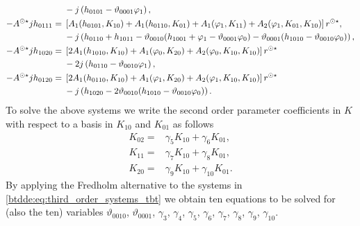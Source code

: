 \begin{equation}
\begin{aligned}
                         & -j\left(h_{0101} - \vartheta_{0001} \varphi_1\right), \\
-A^{\odot\star} jh_{0111} ={}& \left[A_1(h_{0101},K_{10}) + A_1(h_{0110},K_{01}) + A_1(\varphi_1,K_{11}) + A_2(\varphi_1,K_{01},K_{10})\right]r^{\odot\star}, \\
                         & -j\left(h_{0110} + h_{1011} - \vartheta_{0010} (h_{1001} + \varphi_1 - \vartheta_{0001} \varphi_0) - \vartheta_{0001} (h_{1010} - \vartheta_{0010} \varphi_0) \right), \\
-A^{\odot\star} jh_{1020} ={}& \left[2 A_1(h_{1010},K_{10}) + A_1(\varphi_0,K_{20}) + A_2(\varphi_0,K_{10},K_{10})\right]r^{\odot\star} \\
                         & - 2 j\left(h_{0110} - \vartheta_{0010} \varphi_1\right), \\
-A^{\odot\star} jh_{0120} ={}& \left[2 A_1(h_{0110},K_{10}) + A_1(\varphi_1,K_{20}) + A_2(\varphi_1,K_{10},K_{10})\right]r^{\odot\star} \\
                         & -j\left(h_{1020} - 2 \vartheta_{0010} (h_{1010} - \vartheta_{0010} \varphi_0)\right). \\
\end{aligned}
\end{equation}
To solve the above systems we write the second order parameter coefficients in $K$ with respect to a basis in $K_{10}$ and $K_{01}$ as follows
\begin{equation}
\label{btdde:eq:second_order_parameter_coefficients_tbt}
\begin{aligned}
    K_{02} ={}& \gamma_5 K_{10} + \gamma_6 K_{01}, \\
    K_{11} ={}& \gamma_7 K_{10} + \gamma_8 K_{01}, \\
    K_{20} ={}& \gamma_9 K_{10} + \gamma_{10} K_{01}.
\end{aligned}
\end{equation}
By applying the Fredholm alternative to the systems in
\cref{btdde:eq:third_order_systems_tbt} we obtain ten equations to be solved for (also the
ten) variables $\vartheta_{0010}$, $\vartheta_{0001}$, $\gamma_3$, $\gamma_4$,
$\gamma_5$, $\gamma_6$, $\gamma_7$, $\gamma_8$, $\gamma_9$, $\gamma_{10}$.

